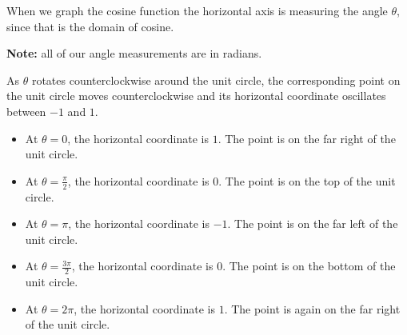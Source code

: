 \documentclass{ximera}
\begin{document}
When we graph the cosine function the horizontal axis is measuring the angle $\theta$, since that is the domain of cosine.

\textbf{Note:}  all of our angle measurements are in radians.





\begin{image}
\end{image}



As $\theta$ rotates counterclockwise around the unit circle, the corresponding point on the unit circle moves counterclockwise and its horizontal coordinate oscillates between $-1$ and $1$.

\begin{itemize}
\item At $\theta = 0$, the horizontal coordinate is $1$. The point is on the far right of the unit circle.
\item At $\theta = \frac{\pi}{2}$, the horizontal coordinate is $0$. The point is on the top of the unit circle.
\item At $\theta = \pi$, the horizontal coordinate is $-1$. The point is on the far left of the unit circle.
\item At $\theta = \frac{3\pi}{2}$, the horizontal coordinate is $0$. The point is on the bottom of the unit circle.
\item At $\theta = 2\pi$, the horizontal coordinate is $1$. The point is again on the far right of the unit circle.
\end{itemize}
\end{document}
